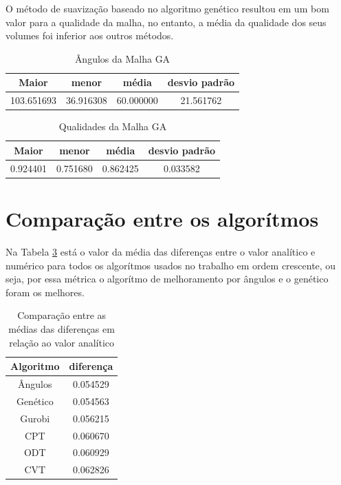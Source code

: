 O método de suavização baseado no algoritmo genético resultou em um bom valor para a qualidade da malha, no entanto, a média da qualidade dos seus volumes foi inferior aos outros métodos.

\begin{table}[hb]
\centering
\par\caption{Ângulos da Malha GA}
\begin{tabular}{c|c|c|c}
Maior&menor&média&desvio padrão\\\hline\hline
103.651693&36.916308&60.000000&21.561762\\\hline
\end{tabular}
\label{tab:angulos-malha-ga}
\end{table}

\begin{table}[hb]
\centering
\par\caption{Qualidades da Malha GA}
\begin{tabular}{c|c|c|c}
Maior&menor&média&desvio padrão\\\hline\hline
0.924401&0.751680&0.862425&0.033582\\\hline
\end{tabular}
\label{tab:qualidades-malha-ga}
\end{table}

\section{Comparação entre os algorítmos}

Na Tabela \ref{tab:comparacao-analitico} está o valor da média das diferenças entre o valor analítico e numérico para todos os algorítmos usados no trabalho em ordem crescente, ou seja, por essa métrica o algorítmo de melhoramento por ângulos e o genético foram os melhores.

\begin{table}
    \centering
    \par\caption{Comparação entre as médias das diferenças em relação ao valor analítico}
    \begin{tabular}{c|c}
        Algoritmo&diferença\\\hline\hline
        Ângulos  &  0.054529 \\\hline
        Genético &  0.054563 \\\hline
        Gurobi   &  0.056215 \\\hline
        CPT      &  0.060670 \\\hline
        ODT      &  0.060929 \\\hline
        CVT      &  0.062826 \\\hline
    \end{tabular}
    \label{tab:comparacao-analitico}
\end{table}

